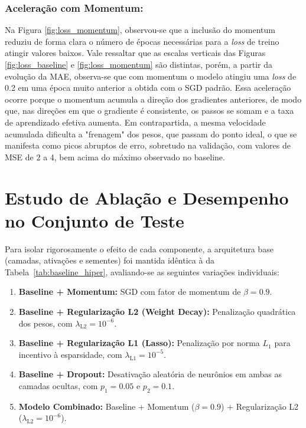 \documentclass[11pt,a4paper]{article}
\begin{document}
\subsubsection{\textbf{Aceleração com Momentum:}} Na Figura \ref{fig:loss_momentum}, observou-se que a inclusão do momentum reduziu de forma clara o número de épocas necessárias para a \textit{loss} de treino atingir valores baixos. Vale ressaltar que as escalas verticais das Figuras \ref{fig:loss_baseline} e \ref{fig:loss_momentum} são distintas, porém, a partir da evolução da MAE, observa-se que com momentum o modelo atingiu uma \textit{loss} de 0.2 em uma época muito anterior a obtida com o SGD padrão. Essa aceleração ocorre porque o momentum acumula a direção dos gradientes anteriores, de modo que, nas direções em que o gradiente é consistente, os passos se somam e a taxa de aprendizado efetiva aumenta. Em contrapartida, a mesma velocidade acumulada dificulta a "frenagem" dos pesos, que passam do ponto ideal, o que se manifesta como picos abruptos de erro, sobretudo na validação, com valores de MSE de 2 a 4, bem acima do máximo observado no baseline.

\section{Estudo de Ablação e Desempenho no Conjunto de Teste}

Para isolar rigorosamente o efeito de cada componente, a arquitetura base (camadas, ativações e sementes) foi mantida idêntica à da Tabela~\ref{tab:baseline_hiper}, avaliando-se as seguintes variações individuais:
\begin{enumerate}
    \item \textbf{Baseline + Momentum:} SGD com fator de momentum de $\beta = 0.9$.
    \item \textbf{Baseline + Regularização L2 (Weight Decay):} Penalização quadrática dos pesos, com $\lambda_{\text{L2}} = 10^{-6}$.
    \item \textbf{Baseline + Regularização L1 (Lasso):} Penalização por norma $L_1$ para incentivo à esparsidade, com $\lambda_{\text{L1}} = 10^{-5}$.
    \item \textbf{Baseline + Dropout:} Desativação aleatória de neurônios em ambas as camadas ocultas, com ${p_1 = 0.05}$ e  $p_2 = 0.1$.
    \item \textbf{Modelo Combinado:} Baseline + Momentum ($\beta = 0.9$) + Regularização L2 ($\lambda_{\text{L2}} = 10^{-6}$).
\end{enumerate}
\end{document}
